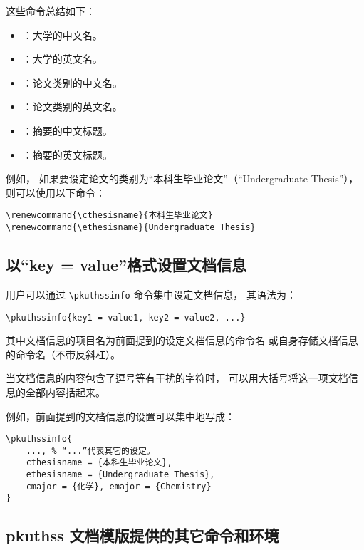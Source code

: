 		这些命令总结如下：
		\begin{itemize}
			\item \texttt{\bfseries\string\cuniversity}：大学的中文名。
			\item \texttt{\bfseries\string\euniversity}：大学的英文名。
			\item \texttt{\bfseries\string\cthesisname}：论文类别的中文名。
			\item \texttt{\bfseries\string\ethesisname}：论文类别的英文名。
			\item \texttt{\bfseries\string\cabstractname}：摘要的中文标题。
			\item \texttt{\bfseries\string\eabstractname}：摘要的英文标题。
		\end{itemize}

		例如，
		如果要设定论文的类别为“本科生毕业论文”（“Undergraduate Thesis”），
		则可以使用以下命令：
\begin{Verbatim}[frame = single]
\renewcommand{\cthesisname}{本科生毕业论文}
\renewcommand{\ethesisname}{Undergraduate Thesis}
\end{Verbatim}

		\subsection{以“key = value”格式设置文档信息}

		用户可以通过 \verb|\pkuthssinfo| 命令集中设定文档信息，
		其语法为：
\begin{Verbatim}[frame = single]
% key1、key2、value1、value2 等为具体文档信息的项目名和内容。
\pkuthssinfo{key1 = value1, key2 = value2, ...}
\end{Verbatim}
		其中文档信息的项目名为前面提到的设定文档信息的命令名%
		或自身存储文档信息的命令名（不带反斜杠）。

		当文档信息的内容包含了逗号等有干扰的字符时，
		可以用大括号将这一项文档信息的全部内容括起来。%

		例如，前面提到的文档信息的设置可以集中地写成：
\begin{Verbatim}[frame = single, tabsize = 4]
\pkuthssinfo{
	..., % “...”代表其它的设定。
	cthesisname = {本科生毕业论文},
	ethesisname = {Undergraduate Thesis},
	cmajor = {化学}, emajor = {Chemistry}
}
\end{Verbatim}

		\subsection{pkuthss 文档模版提供的其它命令和环境}\label{ssec:misc}

